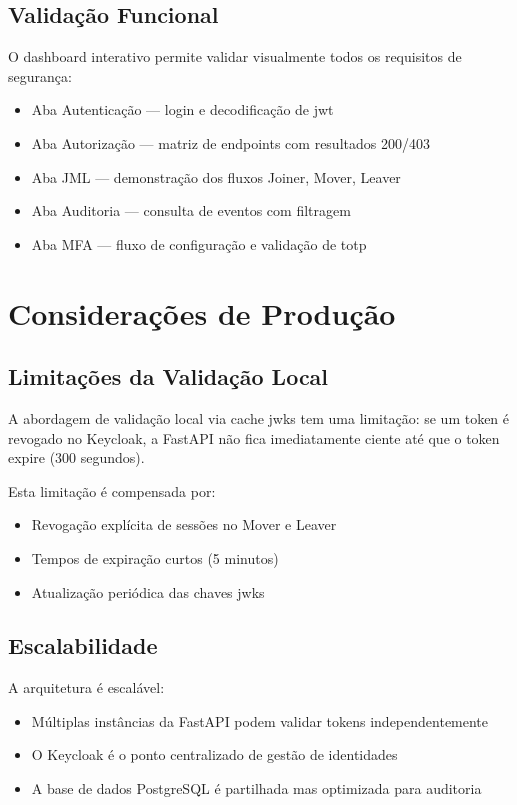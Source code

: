 \subsection{Validação Funcional}

O dashboard interativo permite validar visualmente todos os requisitos de segurança:
\begin{itemize}
  \item Aba Autenticação — login e decodificação de \gls{jwt}
  \item Aba Autorização — matriz de endpoints com resultados 200/403
  \item Aba JML — demonstração dos fluxos Joiner, Mover, Leaver
  \item Aba Auditoria — consulta de eventos com filtragem
  \item Aba MFA — fluxo de configuração e validação de \gls{totp}
\end{itemize}

\section{Considerações de Produção}

\subsection{Limitações da Validação Local}

A abordagem de validação local via cache \gls{jwks} tem uma limitação: se um token é revogado no Keycloak, a FastAPI não fica imediatamente ciente até que o token expire (300 segundos).

Esta limitação é compensada por:
\begin{itemize}
  \item Revogação explícita de sessões no Mover e Leaver
  \item Tempos de expiração curtos (5 minutos)
  \item Atualização periódica das chaves \gls{jwks}
\end{itemize}

\subsection{Escalabilidade}

A arquitetura é escalável:
\begin{itemize}
  \item Múltiplas instâncias da FastAPI podem validar tokens independentemente
  \item O Keycloak é o ponto centralizado de gestão de identidades
  \item A base de dados PostgreSQL é partilhada mas optimizada para auditoria
\end{itemize}

